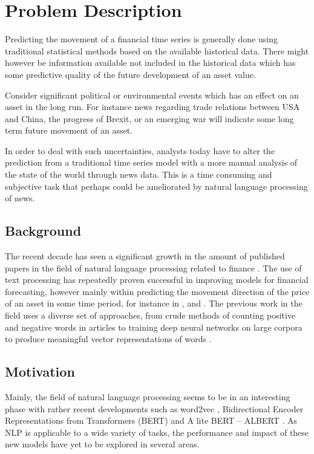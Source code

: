 \chapter{Problem Description}

Predicting the movement of a financial time series is generally done using traditional statistical methods based on the available historical data. There might however be information available not included in the historical data which has some predictive quality of the future development of an asset value. 

Consider significant political or environmental events which has an effect on an asset in the long run. For instance news regarding trade relations between USA and China, the progress of Brexit, or an emerging war will indicate some long term future movement of an asset. 

In order to deal with such uncertainties, analysts today have to alter the prediction from a traditional time series model with a more manual analysis of the state of the world through news data. This is a time consuming and subjective task that perhaps could be ameliorated by natural language processing of news.

\section{Background}

The recent decade has seen a significant growth in the amount of published papers in the field of natural language processing related to finance \citep{xing}. The use of text processing has repeatedly proven successful in improving models for financial forecasting, however mainly within predicting the movement direction of the price of an asset in some time period, for instance in \citet{li2014news}, \citet{heston2017news} and \citet{othan}. The previous work in the field uses a diverse set of approaches, from crude methods of counting positive and negative words in articles to training deep neural networks on large corpora to produce meaningful vector representations of words \citep{arorausing}. 


\section{Motivation}

Mainly, the field of natural language processing seems to be in an interesting phase with rather recent developments such as word2vec \citep{mikolov2013efficient}, Bidirectional Encoder Representations from Transformers (BERT) \citep{devlin2018bert} and A lite BERT -- ALBERT \citep{lan2019albert}. As NLP is applicable to a wide variety of tasks, the performance and impact of these new models have yet to be explored in several areas. 

